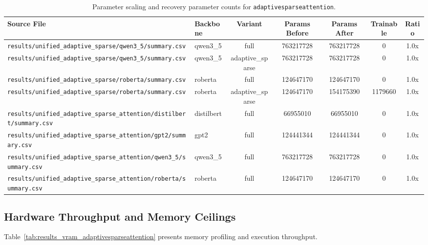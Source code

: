 \begin{table}[t]
\centering
\small
\begin{tabular}{llccccc}
\toprule
\textbf{Source File} & \textbf{Backbone} & \textbf{Variant} & \textbf{Params Before} & \textbf{Params After} & \textbf{Trainable} & \textbf{Ratio} \\
\midrule
\texttt{results/unified\_adaptive\_sparse/qwen3\_5/summary.csv} & qwen3\_5 & full & 763217728 & 763217728 & 0 & 1.0x \\
\texttt{results/unified\_adaptive\_sparse/qwen3\_5/summary.csv} & qwen3\_5 & adaptive\_sparse & 763217728 & 763217728 & 0 & 1.0x \\
\texttt{results/unified\_adaptive\_sparse/roberta/summary.csv} & roberta & full & 124647170 & 124647170 & 0 & 1.0x \\
\texttt{results/unified\_adaptive\_sparse/roberta/summary.csv} & roberta & adaptive\_sparse & 124647170 & 154175390 & 1179660 & 1.0x \\
\texttt{results/unified\_adaptive\_sparse\_attention/distilbert/summary.csv} & distilbert & full & 66955010 & 66955010 & 0 & 1.0x \\
\texttt{results/unified\_adaptive\_sparse\_attention/gpt2/summary.csv} & gpt2 & full & 124441344 & 124441344 & 0 & 1.0x \\
\texttt{results/unified\_adaptive\_sparse\_attention/qwen3\_5/summary.csv} & qwen3\_5 & full & 763217728 & 763217728 & 0 & 1.0x \\
\texttt{results/unified\_adaptive\_sparse\_attention/roberta/summary.csv} & roberta & full & 124647170 & 124647170 & 0 & 1.0x \\
\bottomrule
\end{tabular}
\caption{Parameter scaling and recovery parameter counts for \texttt{adaptivesparseattention}.}
\label{tab:results_params_adaptivesparseattention}
\end{table}

\subsection{Hardware Throughput and Memory Ceilings}
Table~\ref{tab:results_vram_adaptivesparseattention} presents memory profiling and execution throughput.

